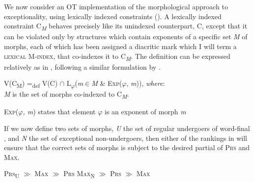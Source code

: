 \documentclass[output=paper,
modfonts
]{LSP/langsci}
\begin{document}
We now consider an OT implementation of the morphological approach to  exceptionality, using lexically indexed constraints (\citealt{pater2000r,pater2006,pater2009r}). A lexically indexed constraint C\textit{\textsubscript{M}} behaves precisely like its unindexed counterpart, C, except that it can be violated only by structures which contain exponents of a specific set \textit{M} of morphs, each of which has been assigned a diacritic mark which I will term a \textsc{lexical M-index}, that co-indexes it to C\textit{\textsubscript{M}}. The definition can be expressed relatively as in , following a similar formulation by \citet{finley2010}.

\ea \label{ex:round:17} 
V(\textsc{C}\textsc{\textsubscript{M}}) =\textsubscript{def} V(C) ${\cap}$ L\textsubscript{$\varphi$}(\textit{m}${\in}$\textit{M} \& \textsc{Exp}($\varphi$, \textit{m})), \textit{where}:\\
\textit{M} is the set of morphs co-indexed to C\textit{\textsubscript{M}}.
 
\textsc{Exp}($\varphi $\textit{, m}) states that element $\varphi$ is an exponent of morph \textit{m}

\z

If we now define two sets of  morphs, \textit{U} the set of regular undergoers of word-final , and \textit{N} the set of exceptional non-undergoers, then either of the rankings in  will ensure that the correct sets of morphs is subject to the desired partial  of \textsc{Prs} and \textsc{Max.} 

\ea \label{ex:round:18}
	\ea \label{ex:round:18a} \textsc{Prs}\textsc{\textsubscript{U}} ${\gg}$ \textsc{Max} \textsc{${\gg}$} \textsc{Prs}
	\ex \label{ex:round:18b} \textsc{Max}\textsc{\textsubscript{N}}\textsc{} \textsc{${\gg}$} \textsc{Prs} \textsc{${\gg}$} \textsc{Max}
	\z
\z
\end{document}
